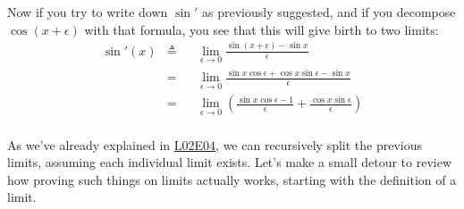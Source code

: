 \documentclass[solutions.tex]{subfiles}
\begin{document}
Now if you try to write down $\sin'$ as previously suggested,
and if you decompose $\cos(x+\epsilon)$ with that formula, you see
that this will give birth to two limits:
\begin{equation*} \begin{aligned}
	\sin'(x) &\triangleq&& \lim_{\epsilon \rightarrow 0}
		\frac{\sin(x+\epsilon)-\sin x}{\epsilon} \\
	~ &=&& \lim_{\epsilon \rightarrow 0}
		\frac{\sin x\cos\epsilon+\cos x\sin\epsilon-\sin x}{\epsilon} \\
	~ &=&& \lim_{\epsilon \rightarrow 0}\left(
		\frac{\sin x\cos\epsilon-1}{\epsilon}+\frac{\cos x\sin\epsilon}{\epsilon}
		\right) \\
\end{aligned} \end{equation*}

As we've already explained in
\href{https://github.com/mbivert/ttm/blob/master/cm/L02E04.pdf}{L02E04},
we can recursively split the previous limits, assuming each individual
limit exists. Let's make a small detour to review how proving such things on
limits actually works, starting with the definition of a limit.

\hrr
\end{document}
